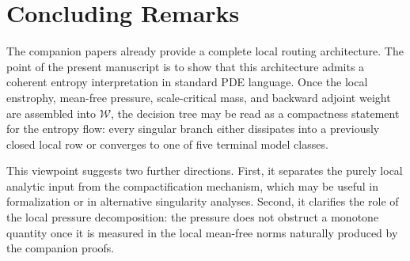 \documentclass[11pt]{amsart}
\numberwithin{equation}{section}
\theoremstyle{plain}
\theoremstyle{definition}
\theoremstyle{remark}
\newcommand{\Wloc}{\mathcal W}
\begin{document}
\section{Concluding Remarks}

The companion papers already provide a complete local routing architecture.  The
point of the present manuscript is to show that this architecture admits a
coherent entropy interpretation in standard PDE language.  Once the local
enstrophy, mean-free pressure, scale-critical mass, and backward adjoint weight
are assembled into \(\Wloc\), the decision tree may be read as a compactness
statement for the entropy flow: every singular branch either dissipates into a
previously closed local row or converges to one of five terminal model classes.

This viewpoint suggests two further directions.  First, it separates the purely
local analytic input from the compactification mechanism, which may be useful in
formalization or in alternative singularity analyses.  Second, it clarifies the
role of the local pressure decomposition: the pressure does not obstruct a
monotone quantity once it is measured in the local mean-free norms naturally
produced by the companion proofs.
\end{document}
